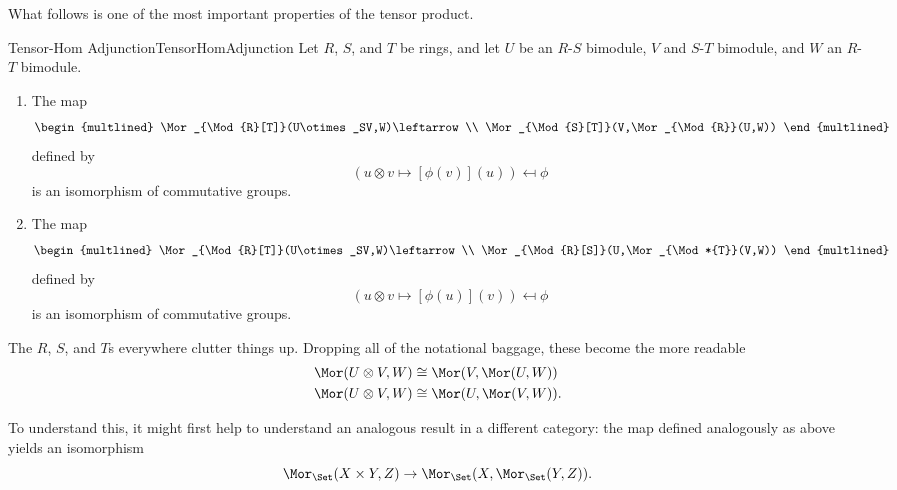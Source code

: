 What follows is one of the most important properties of the tensor product.
\begin{thm}{Tensor-Hom Adjunction}{TensorHomAdjunction}
	Let $R$, $S$, and $T$ be rings, and let $U$ be an $R$-$S$ bimodule, $V$ and $S$-$T$ bimodule, and $W$ an $R$-$T$ bimodule.
	\begin{enumerate}
		\item \label{TensorHomAdjunction(i)}The map
		\begin{equation}\label{eqn5.3.7}
			\begin{multlined}
				\Mor _{\Mod{R}[T]}(U\otimes _SV,W)\leftarrow \\ \Mor _{\Mod{S}[T]}(V,\Mor _{\Mod{R}}(U,W))
			\end{multlined}
		\end{equation}
		defined by
		\begin{equation}\label{eqn5.3.8}
			(u\otimes v\mapsto [\phi (v)](u))\mapsfrom \phi
		\end{equation}
		is an isomorphism of commutative groups.
		\item \label{TensorHomAdjunction(ii)}The map
		\begin{equation}\label{eqn5.3.9}
			\begin{multlined}
				\Mor _{\Mod{R}[T]}(U\otimes _SV,W)\leftarrow \\ \Mor _{\Mod{R}[S]}(U,\Mor _{\Mod*{T}}(V,W))
			\end{multlined}
		\end{equation}
		defined by
		\begin{equation}
			(u\otimes v\mapsto [\phi (u)](v))\mapsfrom \phi
		\end{equation}
		is an isomorphism of commutative groups.
	\end{enumerate}
	\begin{rmk}
		The $R$, $S$, and $T$s everywhere clutter things up.  Dropping all of the notational baggage, these become the more readable
		\begin{align}
			\Mor (U\otimes V,W) & \cong \Mor (V,\Mor (U,W)) \\
			\Mor (U\otimes V,W) & \cong \Mor (U,\Mor (V,W)).
		\end{align}
	\end{rmk}
	\begin{rmk}
		To understand this, it might first help to understand an analogous result in a different category:  the map defined analogously as above yields an isomorphism
		\begin{equation}
			\Mor _{\Set}(X\times Y,Z)\rightarrow \Mor _{\Set}(X,\Mor _{\Set}(Y,Z)).

\end{equation}
\end{rmk}
\end{thm}
